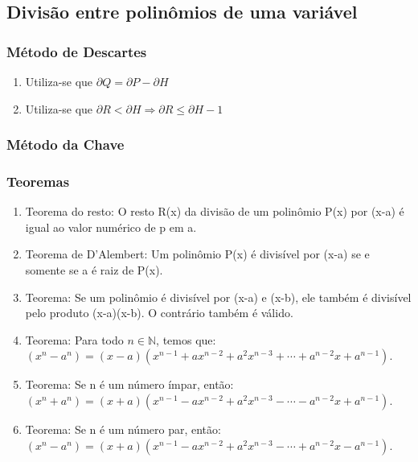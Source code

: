 \documentclass{article}
\begin{document}
\subsection{Divisão entre polinômios de uma variável}
\subsubsection{Método de Descartes}
\begin{enumerate}[\quad\quad$\bullet$]
    \item Utiliza-se que $\partial Q=\partial P-\partial H$
    \item Utiliza-se que $\partial R < \partial H\Rightarrow \partial R\leq\partial H-1$
\end{enumerate}
\subsubsection{Método da Chave}

\usetikzlibrary{matrix}

\subsubsection{Teoremas}
\begin{enumerate}
    \item Teorema do resto: O resto R(x) da divisão de um polinômio P(x) por (x-a) é igual ao valor numérico de p em a.
    \item Teorema de D'Alembert: Um polinômio P(x) é divisível por (x-a) se e somente se a é raiz de P(x).
    \item Teorema: Se um polinômio é divisível por (x-a) e (x-b), ele também é divisível pelo produto (x-a)(x-b). O contrário também é válido.
    \item Teorema: Para todo $n\in\mathbb{N}$, temos que: $(x^n-a^n)=(x-a)(x^{n-1}+ax^{n-2}+a^2x^{n-3}+\cdots+a^{n-2}x+a^{n-1})$.
    \item Teorema: Se n é um número ímpar, então: $(x^n+a^n)=(x+a)(x^{n-1}-ax^{n-2}+a^2x^{n-3}-\cdots-a^{n-2}x+a^{n-1})$.
    \item Teorema: Se n é um número par, então: $(x^n-a^n)=(x+a)(x^{n-1}-ax^{n-2}+a^2x^{n-3}-\cdots+a^{n-2}x-a^{n-1})$.
\end{enumerate}
\end{document}
